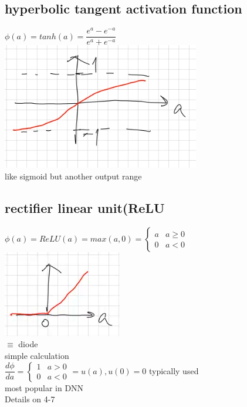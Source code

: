 \subsection{hyperbolic tangent activation function }
$ \phi (a) = tanh(a) = \dfrac{e^{a} -e^{-a}  }{e^{a}  + e^{-a} }    $ \\
\includegraphics[width=\linewidth]{Images/HyperbolicTangentActivation.png} \\
 like sigmoid but another output range 
 \subsection{rectifier linear unit(ReLU}
 $  \phi (a ) = ReLU(a) = max (a,0) =  \left\lbrace \begin{array}{lc}
 a & a \geq 0 \\
 0 & a < 0 
 \end{array} \right.$ \\
 \includegraphics[width=\linewidth]{Images/ReLuActivation.png}\\
 \textbullet $ \equiv $ diode \\
 simple calculation \\
 \textbullet $  \dfrac{d \phi}{da} = \left\lbrace \begin{array}{lc}
 1 & a > 0 \\
 0 & a <0 
 \end{array} \right.  = u(a), u(0) = 0$ typically used \\
 \textbullet most popular in DNN \\
 \textbullet Details on 4-7
